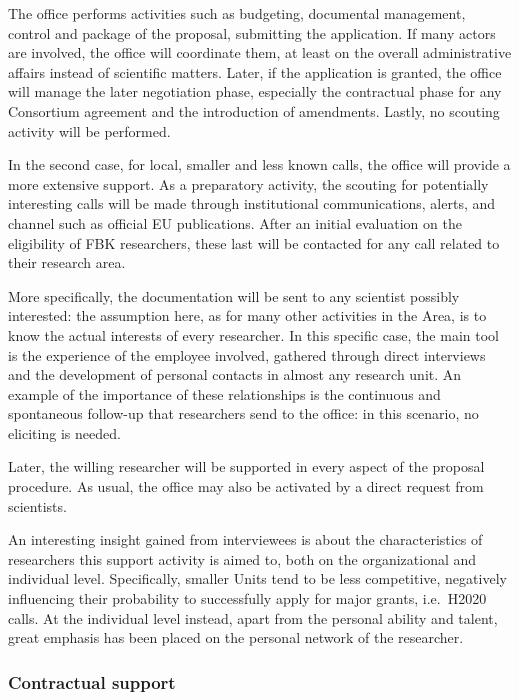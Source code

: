 The office performs activities such as budgeting, documental management, control and package of the proposal, submitting the application. If many actors are involved, the office will coordinate them, at least on the overall administrative affairs instead of scientific matters. Later, if the application is granted, the office will manage the later negotiation phase, especially the contractual phase for any Consortium agreement and the introduction of amendments. Lastly, no scouting activity will be performed. 

In the second case, for local, smaller and less known calls, the office will provide a more extensive support. As a preparatory activity, the scouting for potentially interesting calls will be made through institutional communications, alerts, and channel such as official EU publications. After an initial evaluation on the eligibility of FBK researchers, these last will be contacted for any call related to their research area. 

More specifically, the documentation will be sent to any scientist possibly interested: the assumption here, as for many other activities in the Area, is to know the actual interests of every researcher. In this specific case, the main tool is the experience of the employee involved, gathered through direct interviews and the development of personal contacts in almost any research unit. An example of the importance of these relationships is the continuous and spontaneous follow-up that researchers send to the office: in this scenario, no eliciting is needed.

Later, the willing researcher will be supported in every aspect of the proposal procedure. As usual,  the office may also be activated by a direct request from scientists. 

An interesting insight gained from interviewees is about the characteristics of researchers this support activity is aimed to, both on the organizational and individual level. Specifically, smaller Units tend to be less competitive, negatively influencing their probability to successfully apply for major grants, i.e.\ H2020 calls. At the individual level instead, apart from the personal ability and talent, great emphasis has been placed on the personal network of the researcher. 

\subsubsection{Contractual support}

